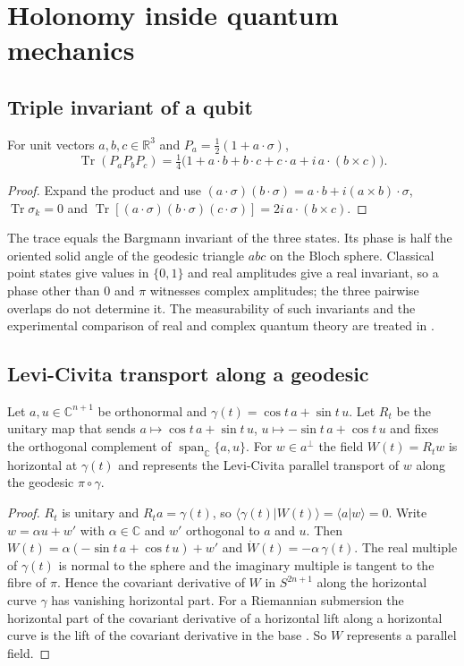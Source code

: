 \section{Holonomy inside quantum mechanics}\label{sec:quantum}

\subsection{Triple invariant of a qubit}
\begin{proposition}\label{prop:qubit}
For unit vectors $a,b,c\in\mathbb{R}^3$ and $P_a=\tfrac12(1+a\cdot\sigma)$,
\[
\operatorname{Tr}(P_aP_bP_c)=\tfrac14\bigl(1+a\cdot b+b\cdot c+c\cdot a+i\,a\cdot(b\times c)\bigr).
\]
\end{proposition}
\begin{proof}
Expand the product and use $(a\cdot\sigma)(b\cdot\sigma)=a\cdot b+i(a\times b)\cdot\sigma$, $\operatorname{Tr}\sigma_k=0$ and $\operatorname{Tr}[(a\cdot\sigma)(b\cdot\sigma)(c\cdot\sigma)]=2i\,a\cdot(b\times c)$.
\end{proof}
The trace equals the Bargmann invariant of the three states. Its phase is half the oriented solid angle of the geodesic triangle $abc$ on the Bloch sphere. Classical point states give values in $\{0,1\}$ and real amplitudes give a real invariant, so a phase other than $0$ and $\pi$ witnesses complex amplitudes; the three pairwise overlaps do not determine it. The measurability of such invariants and the experimental comparison of real and complex quantum theory are treated in \cite{obg,renou}.

\subsection{Levi-Civita transport along a geodesic}
\begin{lemma}\label{lem:transport}
Let $a,u\in\mathbb{C}^{n+1}$ be orthonormal and $\gamma(t)=\cos t\,a+\sin t\,u$. Let $R_t$ be the unitary map that sends $a\mapsto\cos t\,a+\sin t\,u$, $u\mapsto-\sin t\,a+\cos t\,u$ and fixes the orthogonal complement of $\operatorname{span}_{\mathbb{C}}\{a,u\}$. For $w\in a^\perp$ the field $W(t)=R_tw$ is horizontal at $\gamma(t)$ and represents the Levi-Civita parallel transport of $w$ along the geodesic $\pi\circ\gamma$.
\end{lemma}
\begin{proof}
$R_t$ is unitary and $R_ta=\gamma(t)$, so $\langle\gamma(t)|W(t)\rangle=\langle a|w\rangle=0$. Write $w=\alpha u+w'$ with $\alpha\in\mathbb{C}$ and $w'$ orthogonal to $a$ and $u$. Then $W(t)=\alpha(-\sin t\,a+\cos t\,u)+w'$ and $\dot W(t)=-\alpha\,\gamma(t)$. The real multiple of $\gamma(t)$ is normal to the sphere and the imaginary multiple is tangent to the fibre of $\pi$. Hence the covariant derivative of $W$ in $S^{2n+1}$ along the horizontal curve $\gamma$ has vanishing horizontal part. For a Riemannian submersion the horizontal part of the covariant derivative of a horizontal lift along a horizontal curve is the lift of the covariant derivative in the base \cite{oneill}. So $W$ represents a parallel field.
\end{proof}

